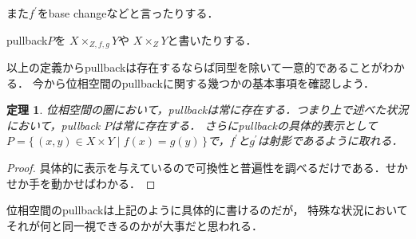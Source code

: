 \documentclass[leqno, a4paper, 12pt, dvipdfmx]{jsarticle}
\newtheorem{thm}{定理}
\begin{document}
また$f^{\prime}$をbase changeなどと言ったりする．


pullback$P$を
$X\times_{Z, f, g} Y$や
$X\times_{Z} Y$と書いたりする．

以上の定義からpullbackは存在するならば同型を除いて一意的であることがわかる．
今から位相空間のpullbackに関する幾つかの基本事項を確認しよう．

\begin{thm}
位相空間の圏において，pullbackは常に存在する．つまり上で述べた状況において，pullback $P$は常に存在する．
さらにpullbackの具体的表示として$P=\{\, (x, y)\in X\times Y\mid f(x)=g(y) \, \}$で，$f^{\prime}$と$g^{\prime}$は射影であるように取れる．
\end{thm}
\begin{proof}
具体的に表示を与えているので可換性と普遍性を調べるだけである．せかせか手を動かせばわかる．
\end{proof}

位相空間のpullbackは上記のように具体的に書けるのだが，
特殊な状況においてそれが何と同一視できるのかが大事だと思われる．
\end{document}
